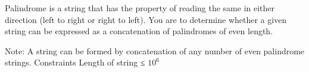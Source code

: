 Palindrome is a string that has the property of reading the same in either direction (left to right or right to left). You are to determine whether a given string can be expressed as a concatenation of palindromes of even length.  

   Note: A string can be formed by concatenation of any number of even palindrome strings.
Constraints
Length of string ≤ $10^{6}$